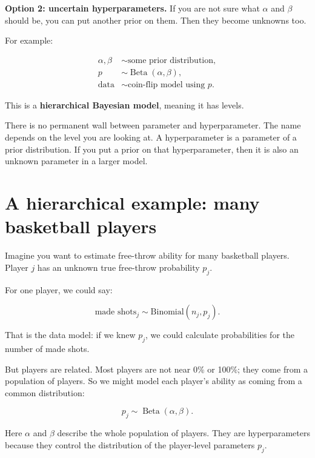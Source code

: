 \documentclass[11pt]{article}
\newcommand{\data}{\text{data}}
\begin{document}
\textbf{Option 2: uncertain hyperparameters.} If you are not sure what $\alpha$ and $\beta$ should be, you can put another prior on them. Then they become unknowns too.

For example:

\[
\begin{aligned}
\alpha,\beta &\sim \text{some prior distribution},\\
p &\sim \operatorname{Beta}(\alpha,\beta),\\
\data &\sim \text{coin-flip model using }p.
\end{aligned}
\]

This is a \textbf{hierarchical Bayesian model}, meaning it has levels.

\begin{warningbox}
There is no permanent wall between parameter and hyperparameter. The name depends on the level you are looking at. A hyperparameter is a parameter of a prior distribution. If you put a prior on that hyperparameter, then it is also an unknown parameter in a larger model.
\end{warningbox}

\section{A hierarchical example: many basketball players}

Imagine you want to estimate free-throw ability for many basketball players. Player $j$ has an unknown true free-throw probability $p_j$.

For one player, we could say:

\[
\text{made shots}_j \sim \text{Binomial}(n_j,p_j).
\]

That is the data model: if we knew $p_j$, we could calculate probabilities for the number of made shots.

But players are related. Most players are not near 0\% or 100\%; they come from a population of players. So we might model each player's ability as coming from a common distribution:

\[
p_j \sim \operatorname{Beta}(\alpha,\beta).
\]

Here $\alpha$ and $\beta$ describe the whole population of players. They are hyperparameters because they control the distribution of the player-level parameters $p_j$.
\end{document}
